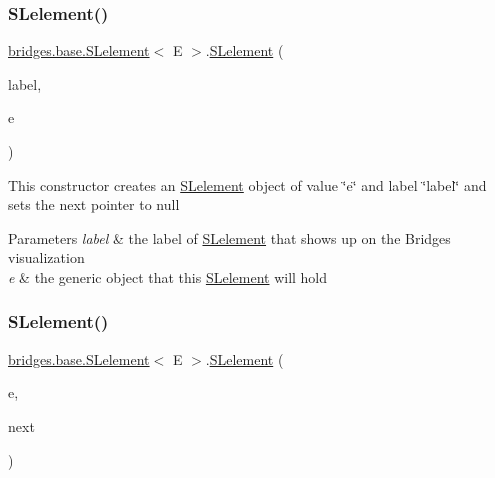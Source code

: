 \subsubsection{\texorpdfstring{S\+Lelement()}{SLelement()}\hspace{0.1cm}{\footnotesize\ttfamily [2/4]}}
{\footnotesize\ttfamily \hyperlink{classbridges_1_1base_1_1_s_lelement}{bridges.\+base.\+S\+Lelement}$<$ E $>$.\hyperlink{classbridges_1_1base_1_1_s_lelement}{S\+Lelement} (\begin{DoxyParamCaption}\item[{String}]{label,  }\item[{E}]{e }\end{DoxyParamCaption})}

This constructor creates an \hyperlink{classbridges_1_1base_1_1_s_lelement}{S\+Lelement} object of value \char`\"{}e\char`\"{} and label \char`\"{}label\char`\"{} and sets the next pointer to null 
\begin{DoxyParams}{Parameters}
{\em label} & the label of \hyperlink{classbridges_1_1base_1_1_s_lelement}{S\+Lelement} that shows up on the Bridges visualization \\
\hline
{\em e} & the generic object that this \hyperlink{classbridges_1_1base_1_1_s_lelement}{S\+Lelement} will hold \\
\hline
\end{DoxyParams}
\hypertarget{classbridges_1_1base_1_1_s_lelement_abc5e333fd2f3289eede108175908f97d}{}\label{classbridges_1_1base_1_1_s_lelement_abc5e333fd2f3289eede108175908f97d} 
\subsubsection{\texorpdfstring{S\+Lelement()}{SLelement()}\hspace{0.1cm}{\footnotesize\ttfamily [3/4]}}
{\footnotesize\ttfamily \hyperlink{classbridges_1_1base_1_1_s_lelement}{bridges.\+base.\+S\+Lelement}$<$ E $>$.\hyperlink{classbridges_1_1base_1_1_s_lelement}{S\+Lelement} (\begin{DoxyParamCaption}\item[{E}]{e,  }\item[{\hyperlink{classbridges_1_1base_1_1_s_lelement}{S\+Lelement}$<$ E $>$}]{next }\end{DoxyParamCaption})}

